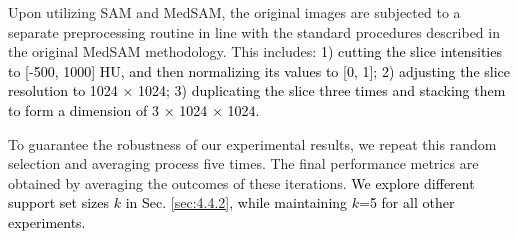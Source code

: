 \documentclass[times,twocolumn,final]{elsarticle}
\begin{document}
\par 
\par Upon utilizing SAM and MedSAM, the original images are subjected to a separate preprocessing routine in line with the standard procedures described in the original MedSAM methodology. This includes\textcolor{black}{: 1) cutting the slice intensities to [-500, 1000] HU, and then normalizing its values to [0, 1]; 2) adjusting the slice resolution to 1024 × 1024; 3) duplicating the slice three times and stacking them to form a dimension of 3 × 1024 × 1024.}
\par To guarantee the robustness of our experimental results, we repeat this random selection and averaging process five times. The final performance metrics are obtained by averaging the outcomes of these iterations. \textcolor{black}{We explore different support set sizes $k$ in Sec. \ref{sec:4.4.2}, while maintaining $k$=5 for all other experiments.}
\end{document}
